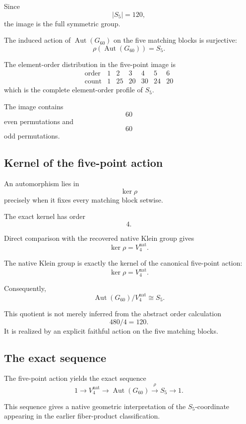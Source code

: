 Since
\[
|S_5|=120,
\]
the image is the full symmetric group.

\begin{theorem}
The induced action of
\(\operatorname{Aut}(G_{60})\) on the five matching blocks is
surjective:
\[
\rho(\operatorname{Aut}(G_{60}))=S_5.
\]
\end{theorem}

The element-order distribution in the five-point image is
\[
\begin{array}{c|rrrrrr}
\text{order} & 1 & 2 & 3 & 4 & 5 & 6\\
\hline
\text{count} & 1 & 25 & 20 & 30 & 24 & 20
\end{array}
\]
which is the complete element-order profile of \(S_5\).

The image contains
\[
60
\]
even permutations and
\[
60
\]
odd permutations.

\subsection{Kernel of the five-point action}

An automorphism lies in
\[
\ker\rho
\]
precisely when it fixes every matching block setwise.

The exact kernel has order
\[
4.
\]

Direct comparison with the recovered native Klein group gives
\[
\ker\rho
=
V_4^{\mathrm{nat}}.
\]

\begin{theorem}
The native Klein group is exactly the kernel of the canonical
five-point action:
\[
\ker\rho=V_4^{\mathrm{nat}}.
\]
\end{theorem}

Consequently,
\[
\operatorname{Aut}(G_{60})/V_4^{\mathrm{nat}}
\cong S_5.
\]

This quotient is not merely inferred from the abstract order
calculation
\[
480/4=120.
\]
It is realized by an explicit faithful action on the five matching
blocks.

\subsection{The exact sequence}

The five-point action yields the exact sequence
\[
1
\longrightarrow
V_4^{\mathrm{nat}}
\longrightarrow
\operatorname{Aut}(G_{60})
\overset{\rho}{\longrightarrow}
S_5
\longrightarrow
1.
\]

This sequence gives a native geometric interpretation of the
\(S_5\)-coordinate appearing in the earlier fiber-product
classification.

